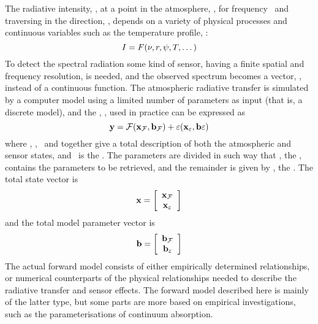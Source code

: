  The radiative intensity, \Mpi, at a point in the atmosphere, \Rds, for
 frequency \Frq\ and traversing in the direction, \ZntAng, depends
 on a variety of physical processes and continuous variables such as
 the temperature profile, \Tmp:
 \begin{equation}
   I = F(\nu,r,\psi,T,\dots)
 \end{equation} 
 To detect the spectral radiation some kind of sensor, having a finite
 spatial and frequency resolution, is needed, and the observed
 spectrum becomes a vector, \MsrVct, instead of a continuous function.
 The atmospheric radiative transfer is simulated by a computer model
 using a limited number of parameters as input (that is, a discrete
 model), and the , \FrwMdl, used in practice can
 be expressed as
 \begin{equation}
   \mathbf{y} = \mathcal{F}(\mathbf{x}_{\mathcal{F}},\mathbf{b}_{\mathcal{F}}) + 
                      \varepsilon(\mathbf{x}_{\varepsilon},\mathbf{b}{\varepsilon})
  \label{eq:formalism:fm}
 \end{equation}
 where \aSttVct{\FrwMdl}, \aFrwMdlVct{\FrwMdl}, \aSttVct{\MsrErrVct}\ 
 and \aFrwMdlVct{\MsrErrVct} together give a total description of both
 the atmospheric and sensor states, and \MsrErrVct\ is the
 . The parameters are divided in such way
 that \SttVct, the \textindex{state vector}, contains the parameters to
 be retrieved, and the remainder is given by \FrwMdlVct, the
 . The total state vector is
 \begin{equation}
   \mathbf{x} = \left[ \begin{array}{c} \mathbf{x}_{\mathcal{F}} \\ 
                                     \mathbf{x}_{\varepsilon} \end{array} \right]
 \end{equation}
 and the total model parameter vector is
 \begin{equation}
   \mathbf{b} = \left[ \begin{array}{c} \mathbf{b}_{\mathcal{F}} \\ 
                                    \mathbf{b}_{\varepsilon} \end{array} \right]
 \end{equation}
 The actual forward model consists of either empirically determined
 relationships, or numerical counterparts of the physical
 relationships needed to describe the radiative transfer and sensor
 effects. The forward model described here is mainly of the latter
 type, but some parts are more based on empirical investigations, such
 as the parameterisations of continuum absorption. 
  
